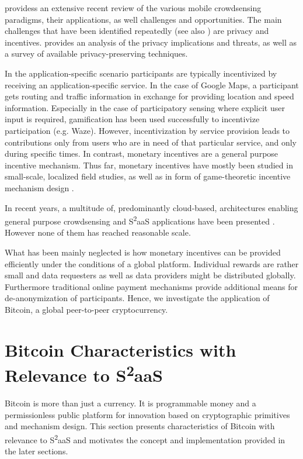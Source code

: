 \cite{guo2015mobile} providess an extensive recent review of the various mobile crowdsensing paradigms, their applications, as well challenges and opportunities. 
The main challenges that have been identified repeatedly (see also \parencite{he2015privacy}) are privacy and incentives. \parencite{Christin2015} provides an analysis of the privacy implications and threats, as well as a survey of available privacy-preserving techniques. 

In the application-specific scenario participants are typically incentivized by receiving an application-specific service. In the case of Google Maps, a participant gets routing and traffic information in exchange for providing location and speed information. Especially in the case of participatory sensing where explicit user input is required, gamification \parencite{Deterding:2011:GDE:2181037.2181040} has been used successfully to incentivize participation (e.g. Waze). However, incentivization by service provision leads to contributions only from users who are in need of that particular service, and only during specific times. In contrast, monetary incentives are a general purpose incentive mechanism. Thus far, monetary incentives have mostly been studied in small-scale, localized field studies, as well as in form of game-theoretic incentive mechanism design \parencite{7101300}. 

In recent years, a multitude of, predominantly cloud-based, architectures enabling general purpose crowdsensing and S\textsuperscript{2}aaS applications have been presented \parencite{6558754,6525603,giannotti2012planetary,Haderer2015,merlino2016mobile}. However none of them has reached reasonable scale.

What has been mainly neglected is how monetary incentives can be provided efficiently under the conditions of a global platform. 
Individual rewards are rather small and data requesters as well as data providers might be distributed globally. Furthermore traditional online payment mechanisms provide additional means for de-anonymization of participants.
Hence, we investigate the application of Bitcoin, a global peer-to-peer cryptocurrency.

\section{Bitcoin Characteristics with Relevance to S\textsuperscript{2}aaS}
\label{sec:s2aas_charac}

Bitcoin is more than just a currency. It is programmable money and a permissionless public platform for innovation based on cryptographic primitives and mechanism design. This section presents characteristics of Bitcoin with relevance to S\textsuperscript{2}aaS and motivates the concept and implementation provided in the later sections.

